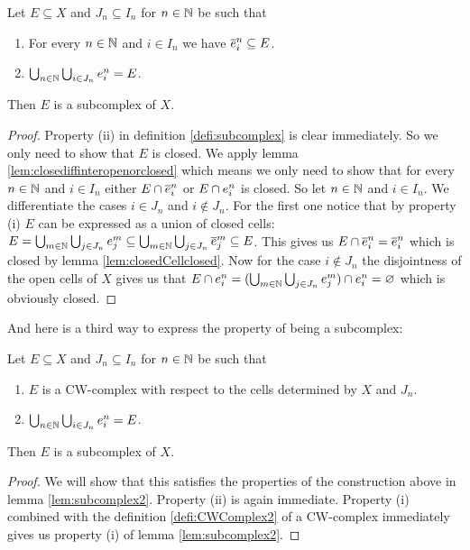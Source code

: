 \begin{lem} \label{lem:subcomplex2}
    Let $E \subseteq X$ and $J_n \subseteq I_n$ for $n \in \bN$ be such that 
    \begin{enumerate}
        \item For every $n \in \bN$ and $i \in I_n$ we have $\closedCell{n}{i} \subseteq E$. 
        \item $\bigcup_{n \in \bN} \bigcup_{i \in J_n} \openCell{n}{i} = E$.
    \end{enumerate}
    Then $E$ is a subcomplex of $X$.
\end{lem}
\begin{proof}
    Property (ii) in definition \ref{defi:subcomplex} is clear immediately. 
    So we only need to show that $E$ is closed. 
    We apply lemma \ref{lem:closediffinteropenorclosed} which means we only need to show that for every $n \in \bN$ and $i \in I_n$ either $E \cap \closedCell{n}{i}$ or $E \cap \openCell{n}{i}$ is closed. 
    So let $n \in \bN$ and $i \in I_n$. 
    We differentiate the cases $i \in J_n$ and $i \notin J_n$.
    For the first one notice that by property (i) $E$ can be expressed as a union of closed cells: $E = \bigcup_{m \in \bN} \bigcup_{j \in J_n} \openCell{m}{j} \subseteq \bigcup_{m \in \bN} \bigcup_{j \in J_n} \closedCell{m}{j} \subseteq E$. 
    This gives us $E \cap \closedCell{n}{i} = \closedCell{n}{i}$ which is closed by lemma \ref{lem:closedCellclosed}. 
    Now for the case $i \notin J_n$ the disjointness of the open cells of $X$ gives us that $E \cap \openCell{n}{i} = (\bigcup_{m \in \bN} \bigcup_{j \in J_n} \openCell{m}{j}) \cap \openCell{n}{i} = \varnothing$ which is obviously closed. 
\end{proof}

And here is a third way to express the property of being a subcomplex:

\begin{lem}
    Let $E \subseteq X$ and $J_n \subseteq I_n$ for $n \in \bN$ be such that 
    \begin{enumerate}
        \item $E$ is a CW-complex with respect to the cells determined by $X$ and $J_n$.
        \item $\bigcup_{n \in \bN} \bigcup_{i \in J_n} \openCell{n}{i} = E$.
    \end{enumerate}
    Then $E$ is a subcomplex of $X$.
\end{lem}
\begin{proof}
    We will show that this satisfies the properties of the construction above in lemma \ref{lem:subcomplex2}.
    Property (ii) is again immediate. 
    Property (i) combined with the definition \ref{defi:CWComplex2} of a CW-complex immediately gives us property (i) of lemma \ref{lem:subcomplex2}.
\end{proof}


